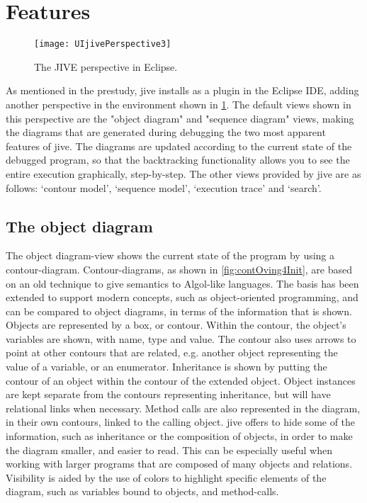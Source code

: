 \section{Features}\label{jiveFeatures}
\begin{figure}[H]
	\centering
	\texttt{[image: UIjivePerspective3]}
	\caption{The JIVE perspective in Eclipse.}
	\label{fig:UIjivePerspective}
\end{figure}

As mentioned in the prestudy, \gls{jive} installs as a plugin in the Eclipse IDE, adding another perspective in the environment shown in \cref{fig:UIjivePerspective}.
The default views shown in this perspective are the "object diagram" and "sequence diagram" views, making the diagrams that are generated during debugging the two most apparent features of \gls{jive}.
The diagrams are updated according to the current state of the debugged program, so that the backtracking functionality allows you to see the entire execution graphically, step-by-step.
The other views provided by \gls{jive} are as follows: `contour model', `sequence model', `execution trace' and `search'.

\subsection{The object diagram}\label{jiveFeatObjectDiag}

The object diagram-view shows the current state of the program by using a contour-diagram.
Contour-diagrams, as shown in \cref{fig:contOving4Init}, are based on an old technique to give semantics to Algol-like languages.
The basis has been extended to support modern concepts, such as object-oriented programming, and can be compared to object diagrams, in terms of the information that is shown.
Objects are represented by a box, or contour.
Within the contour, the object's variables are shown, with name, type and value.
The contour also uses arrows to point at other contours that are related, e.g. another object representing the value of a variable, or an enumerator.
Inheritance is shown by putting the contour of an object within the contour of the extended object. 
Object instances are kept separate from the contours representing inheritance, but will have relational links when necessary.
Method calls are also represented in the diagram, in their own contours, linked to the calling object.
\gls{jive} offers to hide some of the information, such as inheritance or the composition of objects, in order to make the diagram smaller, and easier to read.
This can be especially useful when working with larger programs that are composed of many objects and relations.
Visibility is aided by the use of colors to highlight specific elements of the diagram, such as variables bound to objects, and method-calls.

